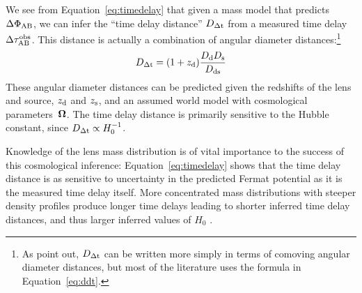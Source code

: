 
We see from Equation~\ref{eq:timedelay} that given a mass
model that predicts $\Delta \Phi_{\rm AB}$, we can infer the ``time
delay distance'' $D_{\Delta{\rm t}}$ from a measured time delay $\Delta \tau_{\rm AB}^{\rm obs}$.
This distance is actually a combination of angular diameter
distances:\footnote{As \citet{SKW06} point out, $D_{\Delta{\rm t}}$ can be written more simply in terms
of comoving angular diameter distances, but most of the literature uses the
formula in Equation~\ref{eq:ddt}.}
%
\begin{equation}
    D_{\Delta{\rm t}} = (1+z_{\rm d}) \frac{D_{\rm d} D_{\rm s}}{D_{\rm ds}}  \label{eq:ddt}
\end{equation}
%
These angular diameter distances can be predicted given the redshifts
of the lens and source, $z_{\rm d}$ and $z_{\rm s}$, and an assumed world model with
cosmological parameters~$\boldsymbol{\Omega}$. The time delay distance is primarily
sensitive to the Hubble constant, since $D_{\Delta{\rm t}} \propto H_0^{-1}$.


Knowledge of the lens mass distribution is of vital importance to the
success of this cosmological inference: Equation~\ref{eq:timedelay}
shows  that the time delay  distance is as sensitive to uncertainty in
the predicted Fermat potential as it is the measured time delay itself.
More concentrated mass distributions with steeper density
profiles produce longer time delays leading to shorter inferred time
delay distances, and thus larger inferred values of $H_0$ \citep{Wuc02,Koc02,Suyu12}.


